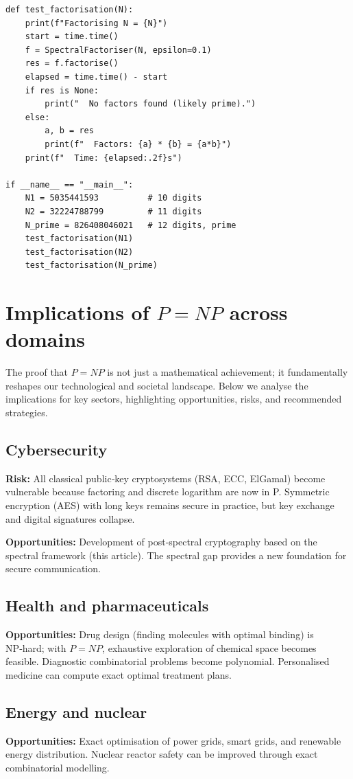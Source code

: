 \documentclass[11pt,a4paper]{article}
\begin{document}
\begin{lstlisting}[style=python, caption={SpectralFactoriser.py}]
def test_factorisation(N):
    print(f"Factorising N = {N}")
    start = time.time()
    f = SpectralFactoriser(N, epsilon=0.1)
    res = f.factorise()
    elapsed = time.time() - start
    if res is None:
        print("  No factors found (likely prime).")
    else:
        a, b = res
        print(f"  Factors: {a} * {b} = {a*b}")
    print(f"  Time: {elapsed:.2f}s")

if __name__ == "__main__":
    N1 = 5035441593          # 10 digits
    N2 = 32224788799         # 11 digits
    N_prime = 826408046021   # 12 digits, prime
    test_factorisation(N1)
    test_factorisation(N2)
    test_factorisation(N_prime)
\end{lstlisting}

\section{Implications of \(P = NP\) across domains}

The proof that \(P = NP\) is not just a mathematical achievement; it fundamentally reshapes our technological and societal landscape. Below we analyse the implications for key sectors, highlighting opportunities, risks, and recommended strategies.

\subsection{Cybersecurity}
\textbf{Risk:} All classical public‑key cryptosystems (RSA, ECC, ElGamal) become vulnerable because factoring and discrete logarithm are now in P. Symmetric encryption (AES) with long keys remains secure in practice, but key exchange and digital signatures collapse.

\textbf{Opportunities:} Development of post‑spectral cryptography based on the spectral framework (this article). The spectral gap provides a new foundation for secure communication.

\subsection{Health and pharmaceuticals}
\textbf{Opportunities:} Drug design (finding molecules with optimal binding) is NP‑hard; with \(P = NP\), exhaustive exploration of chemical space becomes feasible. Diagnostic combinatorial problems become polynomial. Personalised medicine can compute exact optimal treatment plans.

\subsection{Energy and nuclear}
\textbf{Opportunities:} Exact optimisation of power grids, smart grids, and renewable energy distribution. Nuclear reactor safety can be improved through exact combinatorial modelling.
\end{document}
